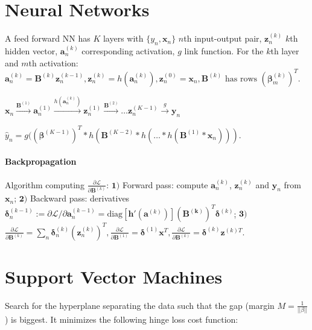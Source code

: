 \documentclass[10pt,a4paper,landscape]{extarticle}
\renewcommand{\bf}[1]{\ensuremath{\mathbf{#1}}}
\newcommand{\bbeta}{\boldsymbol\beta}
\newcommand{\bdelta}{\boldsymbol\delta}
\begin{document}
\begin{multicols*}{4}
\section{Neural Networks}
A feed forward NN has $K$ layers with $\{y_n, \bf{x}_n\}$ $n$th input-output pair, $\bf{z}_n^{(k)}$ $k$th hidden vector, $\bf{a}_n^{(k)}$ corresponding activation, $g$ link function. For the $k$th layer and $m$th activation: 
$\bf{a}_n^{(k)} = \bf{B}^{(k)} \bf{z}_n^{(k-1)}, \bf{z}_n^{(k)} = h( \bf{a}_n^{(k)}), \bf{z}_n^{(0)} = \bf{x}_n, \bf{B}^{(k)} \text{ has rows } (\bbeta_m^{(k)})^T$.

$\bf{x}_n \xrightarrow{\bf{B}^{(1)}} \bf{a}_n^{(1)} \xrightarrow{h(\bf{a}_n^{(k)})} \bf{z}_n^{(1)} \xrightarrow{\bf{B}^{(2)}} \dots \bf{z}_n^{(K-1)} \xrightarrow{g} \bf{y}_n$

$\hat{y}_n = g((\bbeta^{(K-1)})^T * h(\bf{B}^{(K-2)} * h(\dots * h(\bf{B}^{(1)} * \bf{x}_n)))$.

\paragraph{Backpropagation}
Algorithm computing $\frac{\partial \mathcal{L}}{\partial \bf{B}^{(k)}}$:
$\bf{1)}$ Forward pass: compute $\bf{a}_n^{(k)}$, $\bf{z}_n^{(k)}$ and $\bf{y}_n$ from $\bf{x}_n$;
$\bf{2)}$ Backward pass: derivatives $\bdelta_n^{(k-1)} := \partial \mathcal{L} / \partial \bf{a}_n^{(k-1)} = \text{diag}[ \bf{h}'(\bf{a}^{(k)}) ] (\bf{B^{(k)}})^T \bdelta^{(k)}$;
$\bf{3)}$ $\frac{\partial \mathcal{L}}{\partial \bf{B}^{(k)}} = \sum_n \bdelta_n^{(k)} (\bf{z}_n^{(k)})^T, \frac{\partial \mathcal{L}}{\partial \bf{B}^{(1)}} = \bdelta^{(1)} \bf{x}^T, \frac{\partial \mathcal{L}}{\partial \bf{B}^{(k)}} = \bdelta^{(k)} \bf{z}^{(k)T}$.



\section{Support Vector Machines}
Search for the hyperplane separating the data such that the gap (margin $M = \frac{1}{||\beta||}$) is biggest.
It minimizes the following hinge loss cost function:


\end{multicols*}
\end{document}
